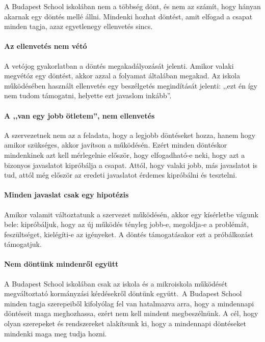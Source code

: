 A Budapest School iskolában nem a többség dönt, és nem az számít, hogy hányan akarnak egy döntés mellé állni. Mindenki hozhat döntést, amit elfogad a csapat minden tagja, azaz egyetlenegy ellenvetés sincs.

\paragraph{Az ellenvetés nem vétó}

A vetójog gyakorlatban a döntés megakadályozását jelenti. Amikor valaki megvétóz egy döntést, akkor azzal a folyamat általában megakad. Az iskola működésében használt ellenvetés egy beszélgetés megindítását jelenti: ,,ezt én így nem tudom támogatni, helyette ezt javaslom inkább''.

\paragraph{A ,,van egy jobb ötletem'', nem ellenvetés}

A szervezetnek nem az a feladata, hogy a legjobb döntéseket hozza, hanem hogy amikor szükséges, akkor javítson a működésén. Ezért minden döntéskor mindenkinek azt kell mérlegelnie először, hogy elfogadható-e neki, hogy azt a bizonyos javaslatot kipróbálja a csapat. Attól, hogy valaki jobb, más javaslatot is tud, attól még először az eredeti javaslatot érdemes kipróbálni és tesztelni.

\paragraph{Minden javaslat csak egy hipotézis}

Amikor valamit változtatunk a szervezet működésén, akkor egy kísérletbe vágunk bele: kipróbáljuk, hogy az új működés tényleg jobb-e, megoldja-e a problémát, feszültséget, kielégí\-ti-e az igényeket. A döntés támogatásakor ezt a próbálkozást támogatjuk.

\paragraph{Nem döntünk mindenről együtt}

A Budapest School iskolá\-ban csak az iskola és a mikroiskola működését megváltoztató kormányzási kérdésekről döntünk együtt.~A Budapest School minden tagja szerepeiből kifolyólag fel van hatalmazva arra, hogy a mindennapi döntéseit maga meghozhassa, ezért nem kell mindent megbeszélnünk. A cél, hogy olyan szerepeket és rendszereket alakítsunk ki, hogy a mindennapi döntéseket mindenki maga meg tudja hozni.

